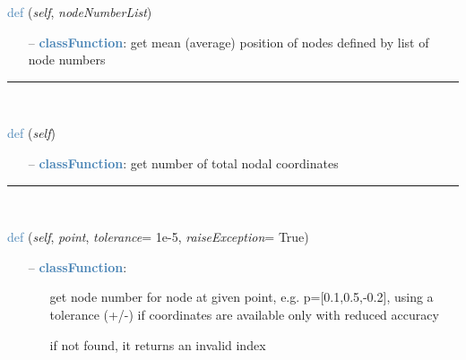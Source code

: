 \begin{itemize}[leftmargin=1.4cm]
\begin{itemize}[leftmargin=1.4cm]
\begin{itemize}[leftmargin=0.5cm]
\begin{itemize}[leftmargin=1.4cm]
\begin{itemize}[leftmargin=1.4cm]
\begin{itemize}[leftmargin=0.5cm]
\begin{flushleft}
\noindent \textcolor{steelblue}{def {\bf {}}}\label{sec:FEM:FEMinterface:GetNodePositionsMean}
({\it self}, {\it nodeNumberList})
\end{flushleft}
\setlength{\itemindent}{0.7cm}
\begin{itemize}[leftmargin=0.7cm]
  \item[--]  \textcolor{steelblue}{\bf classFunction}: get mean (average) position of nodes defined by list of node numbers\vspace{12pt}\end{itemize}
%
\noindent\rule{8cm}{0.75pt}\vspace{1pt} \\ 
\begin{flushleft}
\noindent \textcolor{steelblue}{def {\bf {}}}\label{sec:FEM:FEMinterface:NumberOfCoordinates}
({\it self})
\end{flushleft}
\setlength{\itemindent}{0.7cm}
\begin{itemize}[leftmargin=0.7cm]
  \item[--]  \textcolor{steelblue}{\bf classFunction}: get number of total nodal coordinates\vspace{12pt}\end{itemize}
%
\noindent\rule{8cm}{0.75pt}\vspace{1pt} \\ 
\begin{flushleft}
\noindent \textcolor{steelblue}{def {\bf {}}}\label{sec:FEM:FEMinterface:GetNodeAtPoint}
({\it self}, {\it point}, {\it tolerance}= 1e-5, {\it raiseException}= True)
\end{flushleft}
\setlength{\itemindent}{0.7cm}
\begin{itemize}[leftmargin=0.7cm]
  \item[--]  \textcolor{steelblue}{\bf classFunction}: \vspace{-6pt}
  \begin{itemize}[leftmargin=1.2cm]
\setlength{\itemindent}{-0.7cm}
    \item[] get node number for node at given point, e.g. p=[0.1,0.5,-0.2], using a tolerance (+/-) if coordinates are available only with reduced accuracy
    \item[] if not found, it returns an invalid index

\end{itemize}
\end{itemize}
\end{itemize}
\end{itemize}
\end{itemize}
\end{itemize}
\end{itemize}
\end{itemize}

